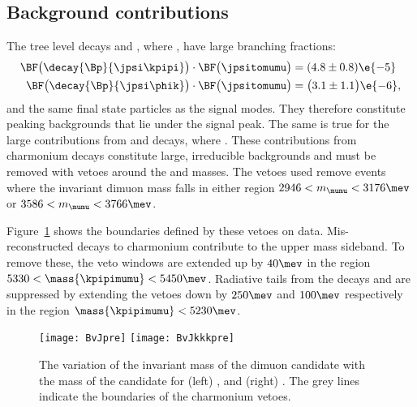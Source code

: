 \subsection{Background contributions}
The tree level decays \decay{\Bp}{\jpsi\kpipi} and \decay{\Bp}{\jpsi\phik}, where
\decay{\jpsi}{\mumu}, have large branching fractions:
\begin{align}
  \BF\big(\decay{\Bp}{\jpsi\kpipi}\big)
  \cdot \BF\big(\jpsitomumu\big)
  &= (4.8 \pm 0.8)\e{-5} \\
  \BF\big(\decay{\Bp}{\jpsi\phik}\big)
  \cdot \BF\big(\jpsitomumu\big)
  &= \big(3.1 \pm 1.1\big)\e{-6},
\end{align}
and the same final state particles as the signal modes.
They therefore constitute peaking backgrounds that lie under the signal peak.
The same is true for the large contributions from \decay{\Bp}{\psitwos\kpipi} and
\decay{\Bp}{\psitwos\phik} decays, where \decay{\psitwos}{\mumu}.
These contributions from charmonium decays constitute large, irreducible backgrounds and must be
removed with vetoes around the \jpsi and \psitwos masses.
The vetoes used remove events where the invariant dimuon mass falls in either region
$2946<m_{\mumu}<3176\mev$ or $3586<m_{\mumu}<3766\mev$.

Figure~\ref{fig:hhh:charmvetoes} shows the boundaries defined by these vetoes on data.
Mis-reconstructed decays to charmonium contribute to the upper mass sideband.
To remove these, the veto windows are extended up by $40\mev$ in the region
$5330<\mass{\kpipimumu}<5450\mev$.
Radiative tails from the decays \decay{\jpsi}{\mumu\gamma} and \decay{\psitwos}{\mumu\gamma} are
suppressed by extending the vetoes down by $250\mev$ and $100\mev$ respectively in the region
$\mass{\kpipimumu}<5230\mev$.


\begin{figure}
  \begin{center}
    \texttt{[image: BvJpre]}
    \texttt{[image: BvJkkkpre]}
    \caption[Charmonium vetoes]
    {\small
      The variation of the invariant mass of the dimuon candidate with the mass of the \Bp
      candidate for
      (left) \btokpipimumu, and
      (right) \btophikmumu.
      The grey lines indicate the boundaries of the charmonium vetoes.
    }
    \label{fig:hhh:charmvetoes}
  \end{center}
\end{figure}

